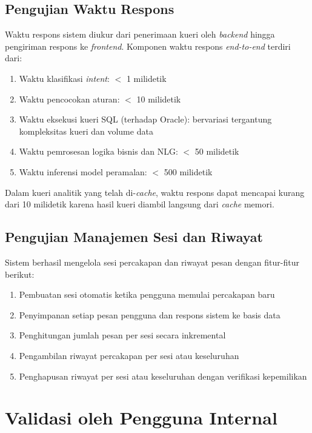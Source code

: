 \subsection{Pengujian Waktu Respons}

Waktu respons sistem diukur dari penerimaan kueri oleh \textit{backend} hingga pengiriman respons ke \textit{frontend}. Komponen waktu respons \textit{end-to-end} terdiri dari:

\begin{enumerate}
    \item Waktu klasifikasi \textit{intent}: $<$ 1 milidetik
    \item Waktu pencocokan aturan: $<$ 10 milidetik
    \item Waktu eksekusi kueri SQL (terhadap Oracle): bervariasi tergantung kompleksitas kueri dan volume data
    \item Waktu pemrosesan logika bisnis dan NLG: $<$ 50 milidetik
    \item Waktu inferensi model peramalan: $<$ 500 milidetik
\end{enumerate}

Dalam kueri analitik yang telah di-\textit{cache}, waktu respons dapat mencapai kurang dari 10 milidetik karena hasil kueri diambil langsung dari \textit{cache} memori.

\subsection{Pengujian Manajemen Sesi dan Riwayat}

Sistem berhasil mengelola sesi percakapan dan riwayat pesan dengan fitur-fitur berikut:

\begin{enumerate}
    \item Pembuatan sesi otomatis ketika pengguna memulai percakapan baru
    \item Penyimpanan setiap pesan pengguna dan respons sistem ke basis data
    \item Penghitungan jumlah pesan per sesi secara inkremental
    \item Pengambilan riwayat percakapan per sesi atau keseluruhan
    \item Penghapusan riwayat per sesi atau keseluruhan dengan verifikasi kepemilikan
\end{enumerate}

\section{Validasi oleh Pengguna Internal}
\label{sec:validasi-pengguna-internal}


